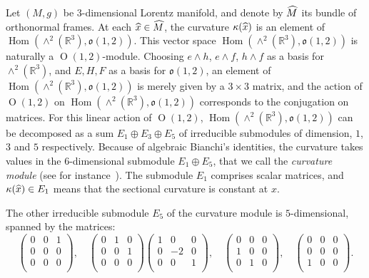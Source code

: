 \documentclass[11pt]{article}
\theoremstyle{definition}
\numberwithin{equation}{section}
\numberwithin{figure}{section}
\numberwithin{table}{section}
\DeclareMathOperator{\Hom}{Hom}
\newcommand*\RR{\mathbb{R}}
\newcommand{\oo}{{\mathfrak{o}}}
\newcommand{\hm}{{\hat{M}}}
\newcommand{\hx}{{\hat{x}}}
\let\oldhat\hat
\renewcommand*\hat[1]{\mathchoice{\widehat{#1}}{\widehat{#1}}{\widehat{#1}}{\oldhat{#1}}}
\begin{document}
Let $(M,g)$ be $3$-dimensional Lorentz manifold, and denote by $\hm$ its bundle of orthonormal frames. At each $\hx \in \hm$, the curvature $\kappa(\hx)$ is an element of $\Hom(\wedge^2(\RR^3),\oo(1,2))$. This vector space $\Hom(\wedge^2(\RR^3),\oo(1,2))$ is naturally a ${\operatorname O}(1,2)$-module. Choosing $e \wedge h$, $e \wedge f$, $h \wedge f$ as a basis for $\wedge^2(\RR^3)$, and $E,H,F$ as a basis for $\oo(1,2)$, an element of $\Hom(\wedge^2(\RR^3),\oo(1,2))$ is merely given by a $3 \times 3$ matrix, and the action of ${\operatorname O}(1,2)$ on $\Hom(\wedge^2(\RR^3),\oo(1,2))$ corresponds to the conjugation on matrices. For this linear action of ${\operatorname O}(1,2)$, $\Hom(\wedge^2(\RR^3),\oo(1,2))$ can be decomposed as a sum $E_1 \oplus E_3 \oplus E_5$ of irreducible submodules of dimension, $1$, $3$ and $5$ respectively. Because of algebraic Bianchi's identities, the curvature takes values in the $6$-dimensional submodule $E_1 \oplus E_5$, that we call the \emph{curvature module} (see for instance~\cite[Chapter~6]{sharpe}). The submodule $E_1$ comprises scalar matrices, and $\kappa(\hx) \in E_1$ means that the sectional curvature is constant at $x$.



The other irreducible submodule $E_5$ of the curvature module is $5$-dimensional, spanned by the matrices:
\[
\begin{pmatrix} 0&0&1\\ 0&0&0\\ 0&0&0\\
\end{pmatrix},\quad
\begin{pmatrix} 0&1&0\\ 0&0&1\\ 0&0&0\\
\end{pmatrix}
\begin{pmatrix}1&0&0\\ 0&-2 & 0\\0& 0& 1 \\
\end{pmatrix},\quad
\begin{pmatrix} 0&0&0\\ 1&0 &0 \\ 0 & 1 & 0\\
\end{pmatrix},\quad
\begin{pmatrix}
0&0&0 \\ 0&0&0 \\1&0&0 \\
\end{pmatrix}.
\]
\end{document}
